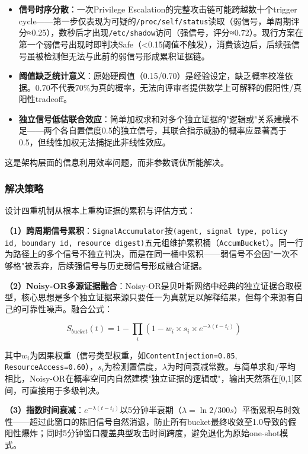 \documentclass[a4paper]{ctexart}
\makeatletter
\renewcommand{\_}{%
  \ifmmode
    \nfss@text{\textunderscore}%
  \else
    \textunderscore\discretionary{}{}{}%
  \fi}
\makeatother
\begin{document}
\begin{itemize}
\item \textbf{信号时序分散}：一次Privilege Escalation的完整攻击链可能跨越数十个trigger cycle——第一步仅表现为可疑的\texttt{/proc/self/status}读取（弱信号，单周期评分≈0.25），数秒后才出现\texttt{/etc/shadow}访问（强信号，评分≈0.72）。现行方案在第一个弱信号出现时即判决Safe（<0.15阈值不触发），消费该边后，后续强信号虽被检测但无法与此前的弱信号形成累积证据链。
\item \textbf{阈值缺乏统计意义}：原始硬阈值（0.15/0.70）是经验设定，缺乏概率校准依据。0.70不代表70\%为真的概率，无法向评审者提供数学上可解释的假阳性/真阳性tradeoff。
\item \textbf{独立信号低估联合效应}：简单加权求和对多个独立证据的"逻辑或"关系建模不足——两个各自置信度0.5的独立信号，其联合指示威胁的概率应显著高于0.5，但线性加权无法捕捉此非线性效应。
\end{itemize}

这是架构层面的信息利用效率问题，而非参数调优所能解决。


\subsubsection{解决策略}



设计四重机制从根本上重构证据的累积与评估方式：


\textbf{（1）跨周期信号累积}：\texttt{SignalAccumulator}按\texttt{(agent, signal\_type, policy\_id, boundary\_id, resource\_digest)}五元组维护累积桶（\texttt{AccumBucket}）。同一行为路径上的多个信号不独立判决，而是在同一桶中累积——弱信号不会因"一次不够格"被丢弃，后续强信号与历史弱信号形成融合证据。


\textbf{（2）Noisy-OR多源证据融合}：Noisy-OR是贝叶斯网络中经典的独立证据合取模型，核心思想是多个独立证据来源只要任一为真就足以解释结果，但每个来源有自己的可靠性噪声。融合公式：


$$S_{bucket}(t) = 1 - \prod_i (1 - w_i \times s_i \times e^{-\lambda(t - t_i)})$$


其中$w_i$为因果权重（信号类型权重，如\texttt{ContentInjection=0.85}, \texttt{ResourceAccess=0.60}），$s_i$为检测置信度，$\lambda$为时间衰减常数。与简单求和/平均相比，Noisy-OR在概率空间内自然建模"独立证据的逻辑或"，输出天然落在[0,1]区间，可直接用于多级判决。


\textbf{（3）指数时间衰减}：$e^{-\lambda(t - t_i)}$以5分钟半衰期（$\lambda = \ln 2 / 300s$）平衡累积与时效性——超过此窗口的陈旧信号自然消退，防止所有bucket最终收敛至1.0导致的假阳性爆炸；同时5分钟窗口覆盖典型攻击时间跨度，避免退化为原始one-shot模式。
\end{document}
